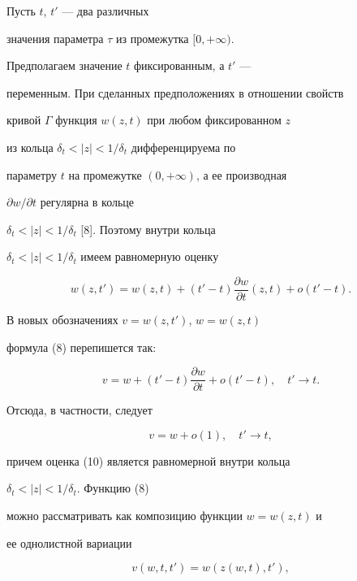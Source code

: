 \begin{pf}


Пусть $t$, $t'$ --- два различных 


значения параметра $\tau$ из промежутка $[0,+\infty)$.


Предполагаем значение $t$ фиксированным, а $t'$ ---


переменным. При сделанных предположениях в отношении свойств


кривой $\Gamma$ функция $w(z,t)$ при любом фиксированном $z$


из кольца $\delta_{t}<|z|<1/\delta_{t}$ дифференцируема по


параметру $t$ на промежутке $(0,+\infty)$, а ее производная


$\partial w/\partial t$ регулярна в кольце


$\delta_{t}<|z|<1/\delta_{t}$ [8]. Поэтому внутри кольца


$\delta_{t}<|z|<1/\delta_{t}$ имеем равномерную оценку


\begin{equation}


w(z,t')=w(z,t)+(t'-t)\frac{\partial w}{\partial t}(z,t)+o(t'-t).


\end{equation}


В новых обозначениях $v=w(z,t')$, $w=w(z,t)$


формула (8) перепишется так:


\begin{equation}


v=w+(t'-t)\frac{\partial w}{\partial t}+o(t'-t),\quad t'\to t.


\end{equation}


Отсюда, в частности, следует


\begin{equation}


v=w+o(1),\quad t'\to t,


\end{equation}


причем оценка (10) является равномерной внутри кольца


$\delta_{t}<|z|<1/\delta_{t}$. Функцию (8) 


можно рассматривать как композицию функции $w=w(z,t)$ и


ее однолистной вариации 


\begin{equation}


v(w,t,t')=w(z(w,t),t'),



\end{equation}
\end{pf}
